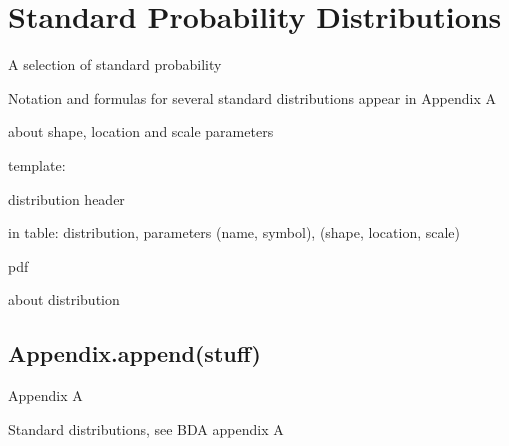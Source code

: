\chapter{Standard Probability Distributions}\label{sec:Appendix A}

A selection of standard probability 

Notation and formulas for several standard distributions appear in Appendix A 


about shape, location and scale parameters

template: 

distribution header

in table: 
distribution, parameters 
(name, symbol), (shape, location, scale)

pdf

about distribution


\section{Appendix.append(stuff)}

Appendix A

Standard distributions, see BDA appendix A


